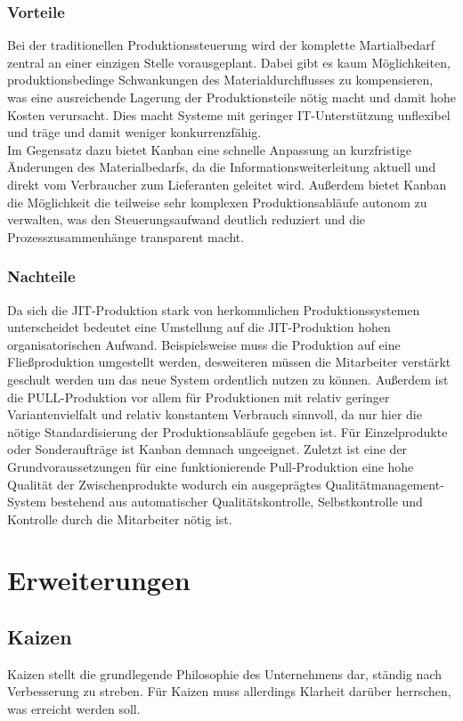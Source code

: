 \documentclass[00_ToyotaProduktionssystem.tex]{subfiles}
\begin{document}
\subsubsection{Vorteile}
Bei der traditionellen Produktionssteuerung wird der komplette Martialbedarf zentral an einer einzigen Stelle vorausgeplant. Dabei gibt es kaum Möglichkeiten, produktionsbedinge Schwankungen des Materialdurchflusses zu kompensieren, was eine ausreichende Lagerung der Produktionsteile nötig macht und damit hohe Kosten verursacht. Dies macht Systeme mit geringer IT-Unterstützung unflexibel und träge und damit weniger konkurrenzfähig.\\
Im Gegensatz dazu bietet Kanban eine schnelle Anpassung an kurzfristige Änderungen des Materialbedarfs, da die Informationsweiterleitung aktuell und direkt vom Verbraucher zum Lieferanten geleitet wird. Außerdem bietet Kanban die Möglichkeit die teilweise sehr komplexen Produktionsabläufe autonom zu verwalten, was den Steuerungsaufwand deutlich reduziert und die Prozesszusammenhänge transparent macht.
\subsubsection{Nachteile}
Da sich die JIT-Produktion stark von herkommlichen Produktionssystemen unterscheidet bedeutet eine Umstellung auf die JIT-Produktion hohen organisatorischen Aufwand. Beispielsweise muss die Produktion auf eine Fließproduktion umgestellt werden, desweiteren müssen die Mitarbeiter verstärkt geschult werden um das neue System ordentlich nutzen zu können. Außerdem ist die PULL-Produktion vor allem für Produktionen mit relativ geringer Variantenvielfalt und relativ konstantem Verbrauch sinnvoll, da nur hier die nötige Standardisierung der Produktionsabläufe gegeben ist. Für Einzelprodukte oder Sonderaufträge ist Kanban demnach ungeeignet. Zuletzt ist eine der Grundvoraussetzungen für eine funktionierende Pull-Produktion eine hohe Qualität der Zwischenprodukte wodurch ein ausgeprägtes Qualitätmanagement-System bestehend aus automatischer Qualitätskontrolle, Selbstkontrolle und Kontrolle durch die Mitarbeiter nötig ist.
\section{Erweiterungen}

\subsection{Kaizen}
Kaizen stellt die grundlegende Philosophie des Unternehmens dar, ständig nach Verbesserung zu streben. Für Kaizen muss allerdings Klarheit darüber herrschen, was erreicht werden soll. 
\end{document}
